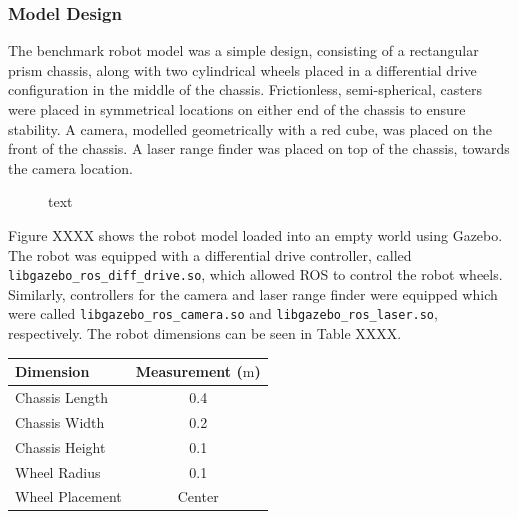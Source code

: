 \documentclass[a4paper]{article}
\begin{document}
\subsubsection{Model Design}
The benchmark robot model was a simple design, consisting of a rectangular prism chassis, along with two cylindrical wheels placed in a differential drive configuration in the middle of the chassis. Frictionless, semi-spherical, casters were placed in symmetrical locations on either end of the chassis to ensure stability. A camera, modelled geometrically with a red cube, was placed on the front of the chassis. A laser range finder was placed on top of the chassis, towards the camera location.
\begin{figure}[h]
\centering
{}
\caption{text}
\end{figure}

\begin{minipage}{0.45\textwidth}
Figure XXXX shows the robot model loaded into an empty world using Gazebo. The robot was equipped with a differential drive controller, called \texttt{libgazebo\_ros\_diff\_drive.so}, which allowed ROS to control the robot wheels. Similarly, controllers for the camera and laser range finder were equipped which were called \texttt{libgazebo\_ros\_camera.so} and \texttt{libgazebo\_ros\_laser.so}, respectively. The robot dimensions can be seen in Table XXXX.
\end{minipage}
\hspace{1cm}
\begin{minipage}{0.45\textwidth}
\centering
{}
\begin{tabular}{lc}
\toprule
\textbf{Dimension} & \textbf{Measurement ($\si{\meter}$)} \\
\midrule
Chassis Length & 0.4\\
Chassis Width & 0.2\\
Chassis Height & 0.1\\
Wheel Radius & 0.1\\
Wheel Placement & Center\\
\bottomrule
\end{tabular}
\end{minipage}
\end{document}
